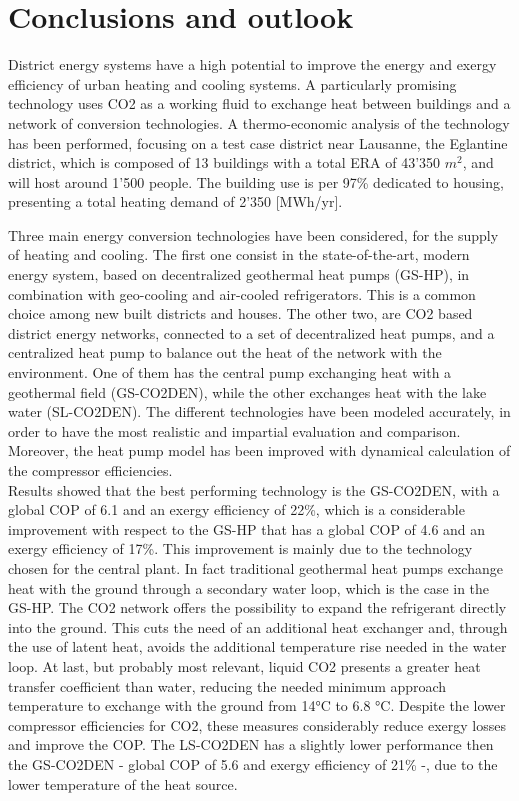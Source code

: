 \documentclass{article}
\begin{document}
\newpage
\section{Conclusions and outlook}
District energy systems have a high potential to improve the energy and exergy efficiency of urban heating and cooling systems. A particularly promising technology uses CO2 as a working fluid to exchange heat between buildings and a network of conversion technologies. A thermo-economic analysis of the technology has been performed, focusing on a test case district near Lausanne, the Eglantine district, which is composed of 13 buildings with a total ERA of  43'350 $m^2$, and will host around 1'500 people. The building use is per 97\% dedicated to housing, presenting a total heating demand of 2'350 [MWh/yr].

Three main energy conversion technologies have been considered, for the supply of heating and cooling. The first one consist in the state-of-the-art, modern energy system, based on decentralized geothermal heat pumps (GS-HP), in combination with geo-cooling and air-cooled refrigerators. This is a common choice among new built districts and houses. The other two, are CO2 based district energy networks, connected to a set of decentralized heat pumps, and a centralized heat pump to balance out the heat of the network with the environment. One of them has the central pump exchanging heat with a geothermal field (GS-CO2DEN), while the other exchanges heat with the lake water (SL-CO2DEN). The different technologies have been modeled accurately, in order to have the most realistic and impartial evaluation and comparison. Moreover, the heat pump model has been improved with dynamical calculation of the compressor efficiencies.\\

Results showed that the best performing technology is the GS-CO2DEN, with a global COP of 6.1 and an exergy efficiency of 22\%, which is a considerable improvement with respect to the GS-HP that has a global COP of 4.6 and an exergy efficiency of 17\%. This improvement is mainly due to the technology chosen for the central plant. In fact traditional geothermal heat pumps exchange heat with the ground through a secondary water loop, which is the case in the GS-HP. The CO2 network offers the possibility to expand the refrigerant directly into the ground. This cuts the need of an additional heat exchanger and, through the use of latent heat, avoids the additional temperature rise needed in the water loop. At last, but probably most relevant, liquid CO2 presents a greater heat transfer coefficient than water, reducing the needed minimum approach temperature to exchange with the ground from 14\si{\celsius} to 6.8 \si{\celsius}. Despite the lower compressor efficiencies for CO2, these measures considerably reduce exergy losses and improve the COP. The LS-CO2DEN has a slightly lower performance then the GS-CO2DEN - global COP of 5.6 and exergy efficiency of 21\% -, due to the lower temperature of the heat source.
\end{document}
